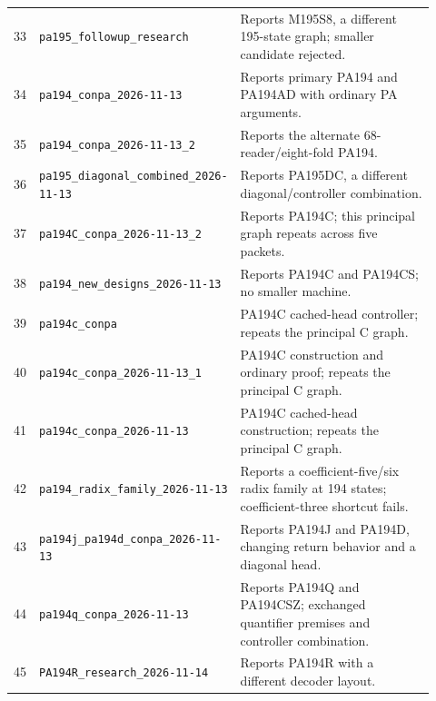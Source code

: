 {\begin{longtable}{@{}r >{\raggedright\arraybackslash}p{0.36\linewidth} >{\raggedright\arraybackslash}p{0.56\linewidth}@{}}
33 & \texttt{pa195\_\allowbreak{}followup\_\allowbreak{}research} & Reports M195S8, a different 195-state graph; smaller candidate rejected.\\[3pt]
34 & \texttt{pa194\_\allowbreak{}conpa\_\allowbreak{}2026-\allowbreak{}11-\allowbreak{}13} & Reports primary PA194 and PA194AD with ordinary PA arguments.\\[3pt]
35 & \texttt{pa194\_\allowbreak{}conpa\_\allowbreak{}2026-\allowbreak{}11-\allowbreak{}13\_\allowbreak{}2} & Reports the alternate 68-reader/eight-fold PA194.\\[3pt]
36 & \texttt{pa195\_\allowbreak{}diagonal\_\allowbreak{}combined\_\allowbreak{}2026-\allowbreak{}11-\allowbreak{}13} & Reports PA195DC, a different diagonal/controller combination.\\[3pt]
37 & \texttt{pa194C\_\allowbreak{}conpa\_\allowbreak{}2026-\allowbreak{}11-\allowbreak{}13\_\allowbreak{}2} & Reports PA194C; this principal graph repeats across five packets.\\[3pt]
38 & \texttt{pa194\_\allowbreak{}new\_\allowbreak{}designs\_\allowbreak{}2026-\allowbreak{}11-\allowbreak{}13} & Reports PA194C and PA194CS; no smaller machine.\\[3pt]
39 & \texttt{pa194c\_\allowbreak{}conpa} & PA194C cached-head controller; repeats the principal C graph.\\[3pt]
40 & \texttt{pa194c\_\allowbreak{}conpa\_\allowbreak{}2026-\allowbreak{}11-\allowbreak{}13\_\allowbreak{}1} & PA194C construction and ordinary proof; repeats the principal C graph.\\[3pt]
41 & \texttt{pa194c\_\allowbreak{}conpa\_\allowbreak{}2026-\allowbreak{}11-\allowbreak{}13} & PA194C cached-head construction; repeats the principal C graph.\\[3pt]
42 & \texttt{pa194\_\allowbreak{}radix\_\allowbreak{}family\_\allowbreak{}2026-\allowbreak{}11-\allowbreak{}13} & Reports a coefficient-five/six radix family at 194 states; coefficient-three shortcut fails.\\[3pt]
43 & \texttt{pa194j\_\allowbreak{}pa194d\_\allowbreak{}conpa\_\allowbreak{}2026-\allowbreak{}11-\allowbreak{}13} & Reports PA194J and PA194D, changing return behavior and a diagonal head.\\[3pt]
44 & \texttt{pa194q\_\allowbreak{}conpa\_\allowbreak{}2026-\allowbreak{}11-\allowbreak{}13} & Reports PA194Q and PA194CSZ; exchanged quantifier premises and controller combination.\\[3pt]
45 & \texttt{PA194R\_\allowbreak{}research\_\allowbreak{}2026-\allowbreak{}11-\allowbreak{}14} & Reports PA194R with a different decoder layout.\\[3pt]

\end{longtable}}
